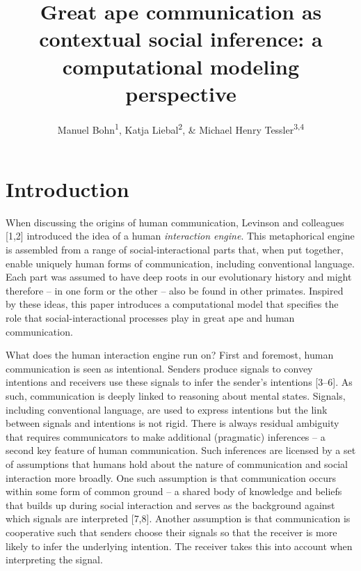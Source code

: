 \documentclass[
  english,
  man,floatsintext]{apa6}
\title{Great ape communication as contextual social inference: a computational modeling perspective}
\author{Manuel Bohn\textsuperscript{1}, Katja Liebal\textsuperscript{2}, \& Michael Henry Tessler\textsuperscript{3,4}}
\date{}
\affiliation{\vspace{0.5cm}\textsuperscript{1} Department of Comparative Cultural Psychology, Max Planck Institute for Evolutionary Anthropology\\\textsuperscript{2} Institute of Biology, Leipzig University\\\textsuperscript{3} Department of Brain and Cognitive Sciences, Massachusetts Institute of Technology\\\textsuperscript{4} DeepMind}
\begin{document}
\maketitle

\hypertarget{introduction}{%
\section{Introduction}\label{introduction}}

When discussing the origins of human communication, Levinson and colleagues {[}1,2{]} introduced the idea of a human \emph{interaction engine}. This metaphorical engine is assembled from a range of social-interactional parts that, when put together, enable uniquely human forms of communication, including conventional language. Each part was assumed to have deep roots in our evolutionary history and might therefore -- in one form or the other -- also be found in other primates. Inspired by these ideas, this paper introduces a computational model that specifies the role that social-interactional processes play in great ape and human communication.

What does the human interaction engine run on? First and foremost, human communication is seen as intentional. Senders produce signals to convey intentions and receivers use these signals to infer the sender's intentions {[}3--6{]}. As such, communication is deeply linked to reasoning about mental states. Signals, including conventional language, are used to express intentions but the link between signals and intentions is not rigid. There is always residual ambiguity that requires communicators to make additional (pragmatic) inferences -- a second key feature of human communication. Such inferences are licensed by a set of assumptions that humans hold about the nature of communication and social interaction more broadly. One such assumption is that communication occurs within some form of common ground -- a shared body of knowledge and beliefs that builds up during social interaction and serves as the background against which signals are interpreted {[}7,8{]}. Another assumption is that communication is cooperative such that senders choose their signals so that the receiver is more likely to infer the underlying intention. The receiver takes this into account when interpreting the signal.
\end{document}
